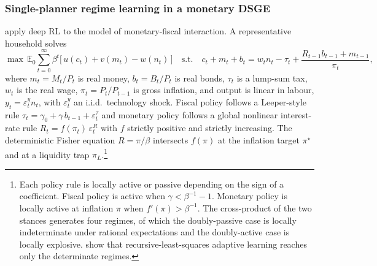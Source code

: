 \subsubsection{Single-planner regime learning in a monetary DSGE}
\label{sec:macro:cjk}

\citet{Chen2021drl} apply deep RL to the \citet{Benhabib2001} model
of monetary-fiscal interaction. A representative household solves
\begin{equation}
\max\, \mathbb{E}_0 \sum_{t=0}^{\infty} \beta^t \bigl[\,u(c_t) + v(m_t) - w(n_t)\,\bigr]
\quad \text{s.t.} \quad c_t + m_t + b_t = w_t n_t - \tau_t + \frac{R_{t-1} b_{t-1} + m_{t-1}}{\pi_t},
\label{eq:macro:cjk-household}
\end{equation}
where $m_t = M_t/P_t$ is real money, $b_t = B_t/P_t$ is real bonds,
$\tau_t$ is a lump-sum tax, $w_t$ is the real wage, $\pi_t =
P_t/P_{t-1}$ is gross inflation, and output is linear in labour,
$y_t = \varepsilon^y_t n_t$, with $\varepsilon^y_t$ an i.i.d.\
technology shock. Fiscal policy follows a Leeper-style rule
$\tau_t = \gamma_0 + \gamma\, b_{t-1} + \varepsilon^\tau_t$ and
monetary policy follows a global nonlinear interest-rate rule
$R_t = f(\pi_t)\, \varepsilon^R_t$ with $f$ strictly positive and
strictly increasing. The deterministic Fisher equation
$R = \pi/\beta$ intersects $f(\pi)$ at the inflation target
$\pi^\star$ and at a liquidity trap $\pi_L$.\footnote{Each policy
rule is locally active or passive depending on the sign of a
coefficient. Fiscal policy is active when $\gamma < \beta^{-1} - 1$.
Monetary policy is locally active at inflation $\pi$ when
$f'(\pi) > \beta^{-1}$. The cross-product of the two stances
generates four regimes, of which the doubly-passive case is locally
indeterminate under rational expectations and the doubly-active case
is locally explosive. \citet{EvansHonkapohja2005} show that
recursive-least-squares adaptive learning reaches only the
determinate regimes.}

